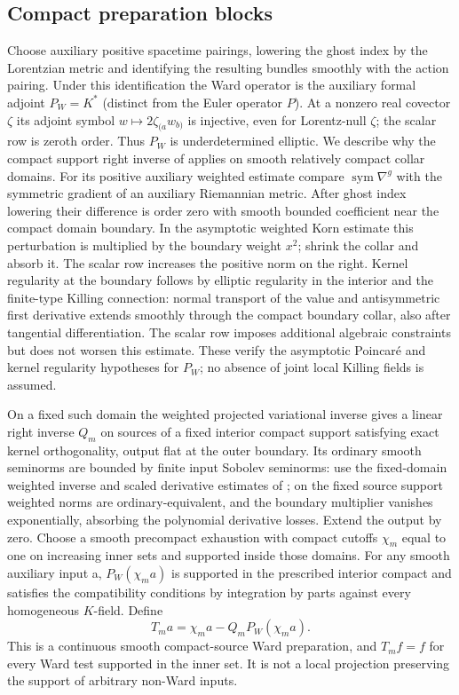 \documentclass[11pt]{article}
\begin{document}
\subsection{Compact preparation blocks}
Choose auxiliary positive spacetime pairings, lowering the ghost index
by the Lorentzian metric and identifying the resulting bundles
smoothly with the action pairing. Under this identification the Ward
operator is the auxiliary formal adjoint $P_W=K^*$ (distinct from
the Euler operator $P$). At a nonzero real covector $\zeta$ its
adjoint symbol $w\mapsto 2\zeta_{(a}w_{b)}$ is injective, even for
Lorentz-null $\zeta$; the scalar row is zeroth order. Thus $P_W$
is underdetermined elliptic. We describe why the compact support
right inverse of \cite[Theorems 3.8 and 5.1]{delay} applies on
smooth relatively compact collar domains. For its positive
auxiliary weighted estimate compare $\operatorname{sym}\nabla^g$
with the symmetric gradient of an auxiliary Riemannian metric.
After ghost index lowering their difference is order zero
with smooth bounded coefficient near the compact domain boundary.
In the asymptotic weighted Korn estimate this perturbation is
multiplied by the boundary weight $x^2$; shrink the collar and
absorb it. The scalar row increases the positive norm on the
right. Kernel regularity at the boundary follows by elliptic
regularity in the interior and the finite-type Killing connection:
normal transport of the value and antisymmetric first derivative
extends smoothly through the compact boundary collar, also after
tangential differentiation. The scalar row imposes additional
algebraic constraints but does not worsen this estimate. These
verify the asymptotic Poincar\'e and kernel regularity hypotheses
for $P_W$; no absence of joint local Killing fields is assumed.

On a fixed such domain the weighted projected variational inverse
gives a linear right inverse $Q_m$ on sources of a fixed interior
compact support satisfying exact kernel orthogonality, output
flat at the outer boundary. Its ordinary smooth seminorms are
bounded by finite input Sobolev seminorms: use the fixed-domain
weighted inverse and scaled derivative estimates of \cite{delay};
on the fixed source support weighted norms are ordinary-equivalent,
and the boundary multiplier vanishes exponentially, absorbing the
polynomial derivative losses. Extend the output by zero. Choose a
smooth precompact exhaustion with compact cutoffs $\chi_m$ equal
to one on increasing inner sets and supported inside those domains.
For any smooth auxiliary input a, $P_W(\chi_m a)$ is supported
in the prescribed interior compact and satisfies the compatibility
conditions by integration by parts against every homogeneous
$K$-field. Define
\[
 T_m a=\chi_m a-Q_m P_W(\chi_m a).
\]
This is a continuous smooth compact-source Ward preparation, and
$T_m f=f$ for every Ward test supported in the inner set. It is not a
local projection preserving the support of arbitrary non-Ward inputs.
\end{document}
